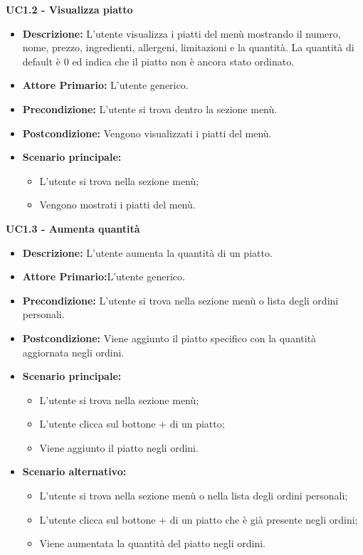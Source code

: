 \textbf{UC1.2 - Visualizza piatto}
\begin{itemize}
    \item \textbf{Descrizione:} L'utente visualizza i piatti del menù mostrando il numero, nome, prezzo, ingredienti, allergeni, limitazioni e la quantità. La quantità di default è 0 ed indica che il piatto non è ancora stato ordinato.
    \item \textbf{Attore Primario:} L'utente generico.
    \item \textbf{Precondizione:} L'utente si trova dentro la sezione menù.
    \item \textbf{Postcondizione:} Vengono visualizzati i piatti del menù.
    \item \textbf{Scenario principale:}  
    \begin{itemize}
        \item L'utente si trova nella sezione menù;
        \item Vengono mostrati i piatti del menù.
    \end{itemize}
\end{itemize}
\textbf{UC1.3 - Aumenta quantità}
\begin{itemize}
    \item \textbf{Descrizione:} L'utente aumenta la quantità di un piatto.
    \item \textbf{Attore Primario:}L'utente generico.
    \item \textbf{Precondizione:} L'utente si trova nella sezione menù o lista degli ordini personali.
    \item \textbf{Postcondizione:} Viene aggiunto il piatto specifico con la quantità aggiornata negli ordini.
    \item \textbf{Scenario principale:}
    \begin{itemize}
        \item L'utente si trova nella sezione menù;
        \item L'utente clicca sul bottone + di un piatto;
        \item Viene aggiunto il piatto negli ordini.
    \end{itemize}
    \item \textbf{Scenario alternativo:}
    \begin{itemize}
        \item L'utente si trova nella sezione menù o nella lista degli ordini personali;
        \item L'utente clicca sul bottone + di un piatto che è già presente negli ordini;
        \item Viene aumentata la quantità del piatto negli ordini.
    \end{itemize}
\end{itemize}
